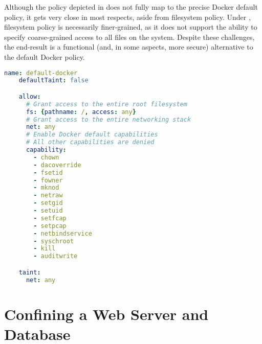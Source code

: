 Although the \bpfbox{} policy depicted in  does not fully
map to the precise Docker default policy, it gets very close in most respects, aside from
filesystem policy. Under \bpfbox{}, filesystem policy is necessarily finer-grained, as it
does not support the ability to specify coarse-grained access to all files on the system.
Despite these challenges, the end-result is a functional (and, in some aspects, more
secure) alternative to the default Docker policy.

\begin{lstlisting}[language=yaml, gobble=4,
  caption={[Implementing the default Docker policy in \bpfcontain{}]
    Implementing the default Docker policy in \bpfcontain{}. A few coarse-grained
    allow-rules can be used to capture permissive Docker defaults that are not covered
    under \bpfcontain{}'s default policy. Other aspects of the Docker defaults are already
    covered under \bpfcontain{} defaults, such as the inability to mount filesystems,
    perform a number of privileged system calls, and interact with non-pid entries in
    procfs and sysfs. Due to \bpfcontain{}'s default policy for file access and \gls{ipc},
    it is neither necessary to specify file access rules for files within the container's
    overlay filesystem not \gls{ipc} rules for processes within the container.
  },
  label={lst:bpfcontain-docker-default}]
    name: default-docker
    defaultTaint: false

    allow:
      # Grant access to the entire root filesystem
      fs: {pathname: /, access: any}
      # Grant access to the entire networking stack
      net: any
      # Enable Docker default capabilities
      # All other capabilities are denied
      capability:
        - chown
        - dacoverride
        - fsetid
        - fowner
        - mknod
        - netraw
        - setgid
        - setuid
        - setfcap
        - setpcap
        - netbindservice
        - syschroot
        - kill
        - auditwrite

    taint:
      net: any
\end{lstlisting}


\section{Confining a Web Server and Database}


